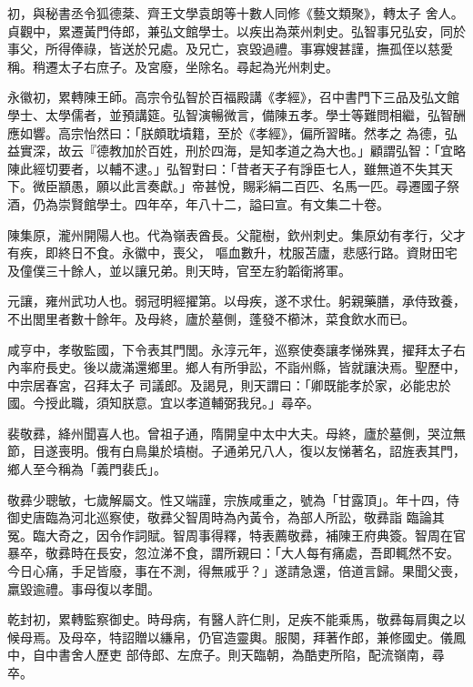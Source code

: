 \begin{pinyinscope}
 初，與秘書丞令狐德棻、齊王文學袁朗等十數人同修《藝文類聚》，轉太子
 舍人。貞觀中，累遷黃門侍郎，兼弘文館學士。以疾出為萊州刺史。弘智事兄弘安，同於事父，所得俸祿，皆送於兄處。及兄亡，哀毀過禮。事寡嫂甚謹，撫孤侄以慈愛稱。稍遷太子右庶子。及宮廢，坐除名。尋起為光州刺史。



 永徽初，累轉陳王師。高宗令弘智於百福殿講《孝經》，召中書門下三品及弘文館學士、太學儒者，並預講筵。弘智演暢微言，備陳五孝。學士等難問相繼，弘智酬應如響。高宗怡然曰：「朕頗耽墳籍，至於《孝經》，偏所習睹。然孝之
 為德，弘益實深，故云『德教加於百姓，刑於四海，是知孝道之為大也。」顧謂弘智：「宜略陳此經切要者，以輔不逮。」弘智對曰：「昔者天子有諍臣七人，雖無道不失其天下。微臣顓愚，願以此言奏獻。」帝甚悅，賜彩絹二百匹、名馬一匹。尋遷國子祭酒，仍為崇賢館學士。四年卒，年八十二，謚曰宣。有文集二十卷。



 陳集原，瀧州開陽人也。代為嶺表酋長。父龍樹，欽州刺史。集原幼有孝行，父才有疾，即終日不食。永徽中，喪父，
 嘔血數升，枕服苫廬，悲感行路。資財田宅及僮僕三十餘人，並以讓兄弟。則天時，官至左豹韜衛將軍。



 元讓，雍州武功人也。弱冠明經擢第。以母疾，遂不求仕。躬親藥膳，承侍致養，不出閭里者數十餘年。及母終，廬於墓側，蓬發不櫛沐，菜食飲水而已。



 咸亨中，孝敬監國，下令表其門閭。永淳元年，巡察使奏讓孝悌殊異，擢拜太子右內率府長史。後以歲滿還鄉里。鄉人有所爭訟，不詣州縣，皆就讓決焉。聖歷中，中宗居春宮，召拜太子
 司議郎。及謁見，則天謂曰：「卿既能孝於家，必能忠於國。今授此職，須知朕意。宜以孝道輔弼我兒。」尋卒。



 裴敬彞，絳州聞喜人也。曾祖子通，隋開皇中太中大夫。母終，廬於墓側，哭泣無節，目遂喪明。俄有白鳥巢於墳樹。子通弟兄八人，復以友悌著名，詔旌表其門，鄉人至今稱為「義門裴氏」。



 敬彞少聰敏，七歲解屬文。性又端謹，宗族咸重之，號為「甘露頂」。年十四，侍御史唐臨為河北巡察使，敬彞父智周時為內黃令，為部人所訟，敬彞詣
 臨論其冤。臨大奇之，因令作詞賦。智周事得釋，特表薦敬彞，補陳王府典簽。智周在官暴卒，敬彞時在長安，忽泣涕不食，謂所親曰：「大人每有痛處，吾即輒然不安。今日心痛，手足皆廢，事在不測，得無戚乎？」遂請急還，倍道言歸。果聞父喪，羸毀逾禮。事母復以孝聞。



 乾封初，累轉監察御史。時母病，有醫人許仁則，足疾不能乘馬，敬彞每肩輿之以候母焉。及母卒，特詔贈以縑帛，仍官造靈輿。服闋，拜著作郎，兼修國史。儀鳳中，自中書舍人歷吏
 部侍郎、左庶子。則天臨朝，為酷吏所陷，配流嶺南，尋卒。




\end{pinyinscope}
